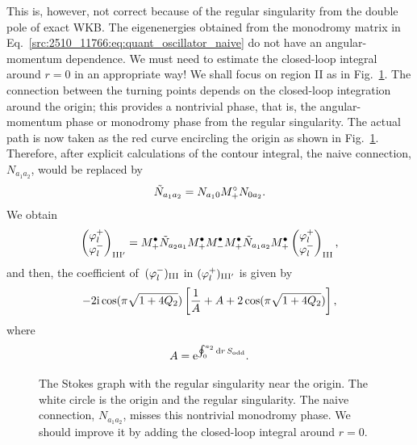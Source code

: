 This is, however, not correct because of the regular singularity from the double pole of exact WKB. The eigenenergies obtained from the monodromy matrix in Eq.~\eqref{src:2510_11766:eq:quant_oscillator_naive} do not have an angular-momentum dependence.
We must need to estimate the closed-loop integral around $r=0$ in an appropriate way!
We shall focus on region II as in Fig.~\ref{src:2510_11766:fig:stokes_oscillator_ii}.
The connection between the turning points depends on the closed-loop integration around the origin; this provides a nontrivial phase,
that is, the angular-momentum phase or monodromy phase from the regular singularity.
The actual path is now taken as the red curve encircling the origin as shown in Fig.~\ref{src:2510_11766:fig:stokes_oscillator_ii}.
Therefore, after explicit calculations of the contour integral, the naive connection, $N_{a_1a_2}$, would be replaced by
\begin{align}
\Tilde{N}_{a_1a_2}=N_{a_10}M_{+}^\circ N_{0a_2} .
\end{align}
We obtain
\begin{align}
    \begin{pmatrix}
        \varphi_l^+ \\ \varphi_l^-
    \end{pmatrix}_{\mathrm{III'}}
    = M_{+}^\bullet \Tilde{N}_{a_2a_1} M_{+}^\bullet M_{-}^\bullet M_{+}^\bullet \Tilde{N}_{a_1a_2} M_{+}^\bullet
    \begin{pmatrix}
        \varphi_l^+ \\ \varphi_l^-
    \end{pmatrix}_{\mathrm{III}} ,
    \label{src:2510_11766:eq:oscillator_connection_infty-infty}
\end{align}
and then, the coefficient of~$(\varphi_l^-)_{\mathrm{III}}$ in $(\varphi_l^+)_{\mathrm{III'}}$ is given by
\begin{align}
    - 2\mathrm{i}  \cos(\pi\sqrt{1+4Q_2})
    \left[\frac{1}{A} + A + 2\cos(\pi\sqrt{1+4Q_2})\right] ,
\end{align}
where
\begin{align}
    A = \mathrm{e}^{\oint_{0}^{a_2} \mathrm{d} r\, S_{\mathrm{odd}}} .
\end{align}
\begin{figure}[t]
\centering
{}
\caption{The Stokes graph with the regular singularity near the origin. The white circle is the origin and the regular singularity. The naive connection, $N_{a_1a_2}$, misses this nontrivial monodromy phase. We should improve it by adding the closed-loop integral around $r=0$.}
\label{src:2510_11766:fig:stokes_oscillator_ii}
\end{figure}
